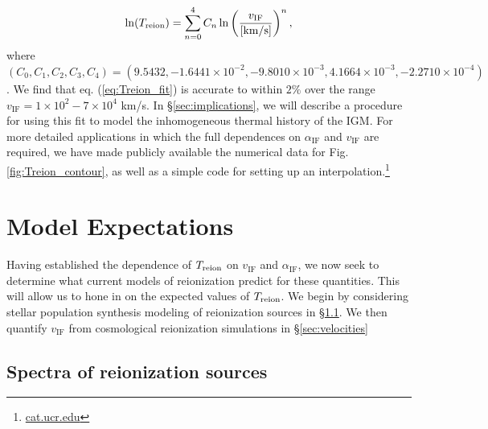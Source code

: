 \documentclass[twocolumn]{aastex62}
\newcommand{\Treion}{T_{\rm reion}}
\newcommand{\vIF}{v_{\mathrm{IF}}}
\newcommand{\spec}{\alpha_{\mathrm{IF}}}
\begin{document}
\begin{equation}
\ln(\Treion) = \sum_{n=0}^4 C_n \ln\left(\frac{\vIF}{\mathrm{[km/s]}}\right)^n,
\label{eq:Treion_fit}
\end{equation} 
where $(C_0, C_1, C_2, C_3, C_4) = (9.5432,\allowbreak -1.6441\times10^{-2},\allowbreak -9.8010\times10^{-3},\allowbreak 4.1664\times10^{-3},\allowbreak  -2.2710 \times 10^{-4})$. We find that eq. (\ref{eq:Treion_fit}) is accurate to within $2\%$ over the range $\vIF = 1\times10^2 - 7\times10^{4}$ km/s.  In \S \ref{sec:implications}, we will describe a procedure for using this fit to model the inhomogeneous thermal history of the IGM. For more detailed applications in which the full dependences on $\spec$ and $\vIF$ are required, we have made publicly available the numerical data for Fig. \ref{fig:Treion_contour}, as well as a simple code for setting up an interpolation.\footnote{\url{cat.ucr.edu}}  




\section{Model Expectations}
\label{sec:model_expectations}

Having established the dependence of $\Treion$ on $\vIF$ and $\spec$, we now seek to determine what current models of reionization predict for these quantities.  This will allow us to hone in on the expected values of $\Treion$.  We begin by considering stellar population synthesis modeling of reionization sources in \S \ref{sec:spec}.  We then quantify $\vIF$ from cosmological reionization simulations in \S \ref{sec:velocities}   

\subsection{Spectra of reionization sources}
\label{sec:spec}
\end{document}
